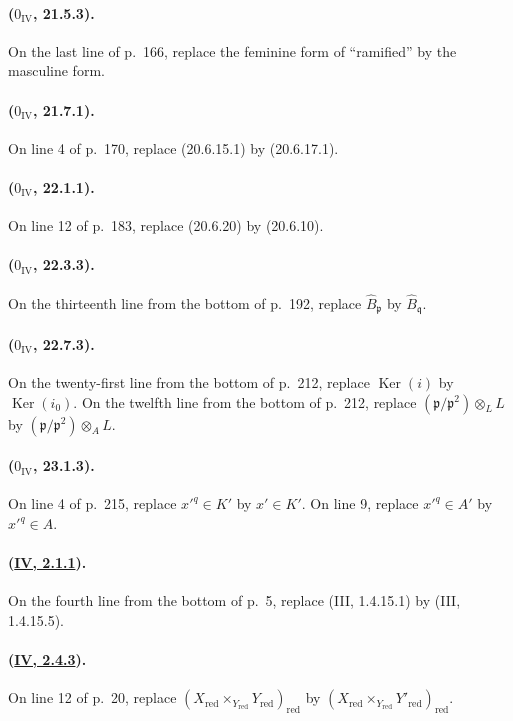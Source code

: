 \paragraph{($0_{\mathrm{IV}}$, 21.5.3).}
On the last line of p.~166, replace the feminine form of ``ramified'' by
the masculine form.

\paragraph{($0_{\mathrm{IV}}$, 21.7.1).}
On line 4 of p.~170, replace (20.6.15.1) by (20.6.17.1).

\paragraph{($0_{\mathrm{IV}}$, 22.1.1).}
On line 12 of p.~183, replace (20.6.20) by (20.6.10).

\paragraph{($0_{\mathrm{IV}}$, 22.3.3).}
On the thirteenth line from the bottom of p.~192, replace
$\widehat B_{\mathfrak p}$ by $\widehat B_{\mathfrak q}$.

\paragraph{($0_{\mathrm{IV}}$, 22.7.3).}
On the twenty-first line from the bottom of p.~212, replace
$\operatorname{Ker}(i)$ by $\operatorname{Ker}(i_0)$.  On the twelfth
line from the bottom of p.~212, replace
$(\mathfrak p/\mathfrak p^2)\otimes_L L$ by
$(\mathfrak p/\mathfrak p^2)\otimes_A L$.

\paragraph{($0_{\mathrm{IV}}$, 23.1.3).}
On line 4 of p.~215, replace $x'^q\in K'$ by $x'\in K'$.  On line 9,
replace $x'^q\in A'$ by $x'^q\in A$.

\paragraph{({\texorpdfstring{\protect\hyperref[IV.2.1.1]{IV, 2.1.1}}{IV, 2.1.1}}).}
On the fourth line from the bottom of p.~5, replace (III, 1.4.15.1) by
(III, 1.4.15.5).

\paragraph{({\texorpdfstring{\protect\hyperref[IV.2.4.3]{IV, 2.4.3}}{IV, 2.4.3}}).}
On line 12 of p.~20, replace
$(X_{\mathrm{red}}\times_{Y_{\mathrm{red}}}Y_{\mathrm{red}})_{\mathrm{red}}$
by
$(X_{\mathrm{red}}\times_{Y_{\mathrm{red}}}Y'_{\mathrm{red}})_{\mathrm{red}}$.

